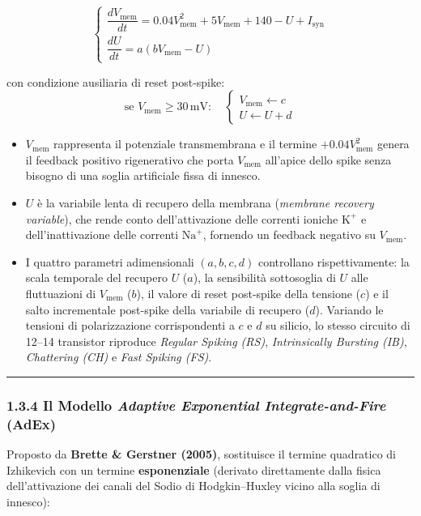 \documentclass[11pt,a4paper]{article}
\begin{document}
\[
\begin{cases}
\dfrac{dV_{\text{mem}}}{dt} = 0.04 V_{\text{mem}}^2 + 5 V_{\text{mem}} + 140 - U + I_{\text{syn}} \\
\dfrac{dU}{dt} = a\left(b V_{\text{mem}} - U\right)
\end{cases}
\]

con condizione ausiliaria di reset post-spike:
\[
\text{se } V_{\text{mem}} \ge 30\,\text{mV}: \quad \begin{cases} V_{\text{mem}} \leftarrow c \\ U \leftarrow U + d \end{cases}
\]

\begin{itemize}
  \item \textbf{$V_{\text{mem}}$} rappresenta il potenziale transmembrana e il termine $+0.04 V_{\text{mem}}^2$ genera il feedback positivo rigenerativo che porta $V_{\text{mem}}$ all'apice dello spike senza bisogno di una soglia artificiale fissa di innesco.
  \item \textbf{$U$} è la variabile lenta di recupero della membrana (\textit{membrane recovery variable}), che rende conto dell'attivazione delle correnti ioniche $\text{K}^+$ e dell'inattivazione delle correnti $\text{Na}^+$, fornendo un feedback negativo su $V_{\text{mem}}$.
  \item I quattro parametri adimensionali $(a, b, c, d)$ controllano rispettivamente: la scala temporale del recupero $U$ ($a$), la sensibilità sottosoglia di $U$ alle fluttuazioni di $V_{\text{mem}}$ ($b$), il valore di reset post-spike della tensione ($c$) e il salto incrementale post-spike della variabile di recupero ($d$). Variando le tensioni di polarizzazione corrispondenti a $c$ e $d$ su silicio, lo stesso circuito di 12--14 transistor riproduce \textit{Regular Spiking (RS)}, \textit{Intrinsically Bursting (IB)}, \textit{Chattering (CH)} e \textit{Fast Spiking (FS)}.
\end{itemize}

\bigskip\hrule\bigskip

\subsubsection{1.3.4 Il Modello \textit{Adaptive Exponential Integrate-and-Fire} (AdEx)}

Proposto da \textbf{Brette \& Gerstner (2005)}, sostituisce il termine quadratico di Izhikevich con un termine \textbf{esponenziale} (derivato direttamente dalla fisica dell'attivazione dei canali del Sodio di Hodgkin--Huxley vicino alla soglia di innesco):
\end{document}
